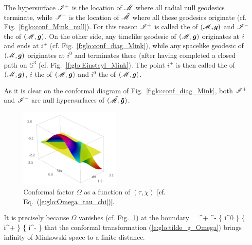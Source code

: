 The hypersurface $\mathscr{I}^+$ is the location of $\tilde{\mathscr{M}}$ where all radial null geodesics
terminate, while $\mathscr{I}^-$ is the location of $\tilde{\mathscr{M}}$ where all these geodesics originate (cf. Fig.~\ref{f:glo:conf_Mink_null}). For this
reason $\mathscr{I}^+$ is called the
of $(\mathscr{M},\bm{g})$
and $\mathscr{I}^-$ the 
of $(\mathscr{M},\bm{g})$.
On the other side, any timelike geodesic of $(\mathscr{M},\bm{g})$ originates at $i\-$ and ends at
$i^+$ (cf. Fig.~\ref{f:glo:conf_diag_Mink}), while any spacelike geodesic
of $(\mathscr{M},\bm{g})$ originates at $i^0$ and terminates there
(after having completed a closed path on $\mathbb{S}^3$ (cf. Fig.~\ref{f:glo:Einstcyl_Mink}).
The point $i^+$ is then called the
of $(\mathscr{M},\bm{g})$,
$i\-$ the 
of $(\mathscr{M},\bm{g})$
and $i^0$ the  of $(\mathscr{M},\bm{g})$.

As it is clear on the conformal diagram of Fig.~\ref{f:glo:conf_diag_Mink},
both $\mathscr{I}^+$ and $\mathscr{I}^-$ are null hypersurfaces of $(\tilde{\mathscr{M}},\bm{\tilde{g}})$.

\begin{figure}
\centerline{\includegraphics[width=0.45\textwidth]{glo_Omega_Mink.png}}
\caption[]{\label{f:glo:Omega_Mink}\footnotesize
Conformal factor $\Omega$ as a function of $(\tau,\chi)$ [cf. Eq.~(\ref{e:glo:Omega_tau_chi})].}
\end{figure}


It is precisely because $\Omega$ vanishes (cf. Fig.~\ref{f:glo:Omega_Mink}) at the boundary
\be
    \overline{\M} \setminus \M = \scri^+ \cup \scri^- \cup \left\{ i^0 \right\} \cup
            \left\{ i^+ \right\} \cup \left\{ i^- \right\}
\ee
that the conformal transformation (\ref{e:glo:tilde_g_Omega}) brings infinity
of Minkowski space to a finite distance.



